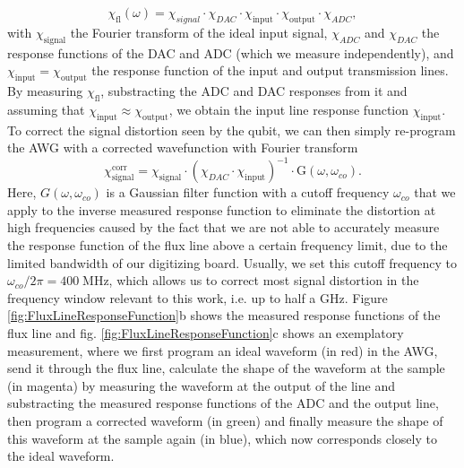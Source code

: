 %
\begin{equation}
\chi_{\mathrm{fl}}(\omega) = \chi_{signal}\cdot \chi_{DAC}\cdot \chi_{\mathrm{input}}\cdot\chi_{\mathrm{output}}\cdot\chi_{ADC}, \label{eq:flux_response}
\end{equation}
%
with $\chi_{\mathrm{signal}}$ the Fourier transform of the ideal input signal, $\chi_{ADC}$ and $\chi_{DAC}$ the response functions of the DAC and ADC (which we measure independently), and $\chi_{\mathrm{input}}=\chi_{\mathrm{output}}$ the response function of the input and output transmission lines. By measuring $\chi_{\mathrm{fl}}$, substracting the ADC and DAC responses from it and assuming that $\chi_{\mathrm{input}} \approx \chi_{\mathrm{output}}$, we obtain the input line response function $\chi_{\mathrm{input}}$. To correct the signal distortion seen by the qubit, we can then simply re-program the AWG with a corrected wavefunction with Fourier transform 
%
\begin{equation}
\chi_{\mathrm{signal}}^{\mathrm{corr}} = \chi_{\mathrm{signal}}\cdot (\chi_{DAC}\cdot\chi_{\mathrm{input}})^{-1}\cdot \mathrm{G}(\omega,\omega_{co}).
\end{equation}
%
Here, $G(\omega,\omega_{co})$ is a Gaussian filter function with a cutoff frequency $\omega_{co}$ that we apply to the inverse measured response function to eliminate the distortion at high frequencies caused by the fact that we are not able to accurately measure the response function of the flux line above a certain frequency limit, due to the limited bandwidth of our digitizing board. Usually, we set this cutoff frequency to $\omega_{co}/2\pi=400\;\mathrm{MHz}$, which allows us to correct most signal distortion in the frequency window relevant to this work, i.e. up to half a GHz. Figure \ref{fig:FluxLineResponseFunction}b shows the measured response functions of the flux line and fig. \ref{fig:FluxLineResponseFunction}c shows an exemplatory measurement, where we first program an ideal waveform (in red) in the AWG, send it through the flux line, calculate the shape of the waveform at the sample (in magenta) by measuring the waveform at the output of the line and substracting the measured response functions of the ADC and the output line, then program a corrected waveform (in green) and finally measure the shape of this waveform at the sample again (in blue), which now corresponds closely to the ideal waveform.
 


\smallskip

